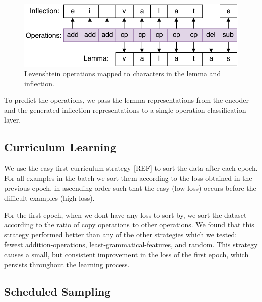 \documentclass[11pt,a4paper]{article}
\begin{document}

\begin{figure}[ht]
\centering
\includegraphics[scale=0.5]{ops.pdf}
\caption{\label{fig:ops} Levenshtein operations mapped to characters in the lemma and
inflection.}
\end{figure}

To predict the operations, we pass the lemma representations from the
encoder and the generated inflection representations to a single operation
classification layer.


\subsection{Curriculum Learning}

We use the easy-first curriculum strategy [REF] to sort the data after
each epoch. For all examples in the batch we sort them according to
the loss obtained in the previous epoch, in ascending order such that
the easy (low loss) occurs before the difficult examples (high loss).

For the first epoch, when we dont have any loss to sort by, we sort
the dataset according to the ratio of copy operations to other
operations. We found that this strategy performed better than any of
the other strategies which we tested: fewest addition-operations,
least-grammatical-features, and random.
This strategy causes a small, but consistent improvement in the loss
of the first epoch, which persists throughout the learning process.

\subsection{Scheduled Sampling}
\end{document}
